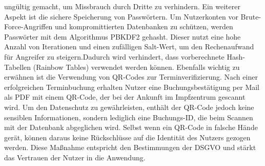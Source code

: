 ungültig gemacht, um Missbrauch durch Dritte zu verhindern.
Ein weiterer Aspekt ist die sichere Speicherung von Passwörtern. Um Nutzerkonten vor 
Brute-Force-Angriffen und kompromittierten Datenbanken zu schützen, werden Passwörter mit 
dem Algorithmus PBKDF2 gehasht. Dieser nutzt eine hohe Anzahl von Iterationen und einen 
zufälligen Salt-Wert, um den Rechenaufwand für Angreifer zu steigern.Dadurch wird 
verhindert, dass vorberechnete Hash-Tabellen (Rainbow Tables) verwendet werden können.
Ebenfalls wichtig zu erwähnen ist die Verwendung von QR-Codes zur Terminverifizierung. 
Nach einer erfolgreichen Terminbuchung erhalten Nutzer eine Buchungsbestätigung per Mail 
als PDF mit einem QR-Code, der bei der Ankunft im Impfzentrum gescannt wird. Um den 
Datenschutz zu gewährleisten, enthält der QR-Code jedoch keine sensiblen Informationen, 
sondern lediglich eine Buchungs-ID, die beim Scannen mit der Datenbank abgeglichen wird. 
Selbst wenn ein QR-Code in falsche Hände gerät, können daraus keine Rückschlüsse auf die 
Identität des Nutzers gezogen werden. Diese Maßnahme entspricht den Bestimmungen der 
DSGVO und stärkt das Vertrauen der Nutzer in die Anwendung.
